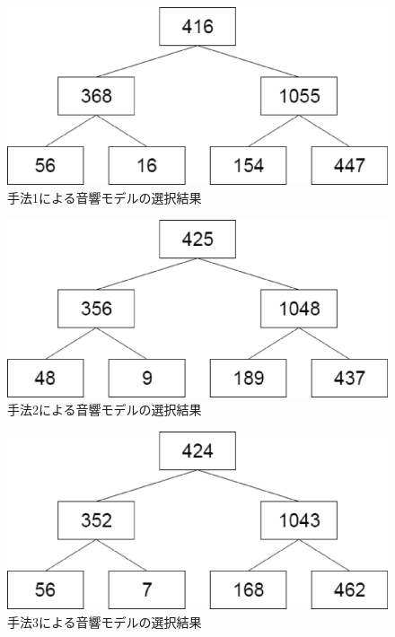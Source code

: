 \begin{figure}[H]
  \begin{center}
    \includegraphics[scale=0.5]{./figure/prob1_clustering.eps}
  \end{center}
  \caption{手法1による音響モデルの選択結果 \label{fig:prob1_clustering}}
\end{figure}

\begin{figure}[H]
  \begin{center}
    \includegraphics[scale=0.5]{./figure/prob2_clustering.eps}
  \end{center}
  \caption{手法2による音響モデルの選択結果 \label{fig:prob2_clustering}}
\end{figure}

\begin{figure}[H]
  \begin{center}
    \includegraphics[scale=0.5]{./figure/prob3_clustering.eps}
  \end{center}
  \caption{手法3による音響モデルの選択結果 \label{fig:prob3_clustering}}
\end{figure}


